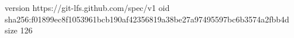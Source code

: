 version https://git-lfs.github.com/spec/v1
oid sha256:f01899ec8f1053961bcb190af42356819a38be27a97495597bc6b3574a2fbb4d
size 126

